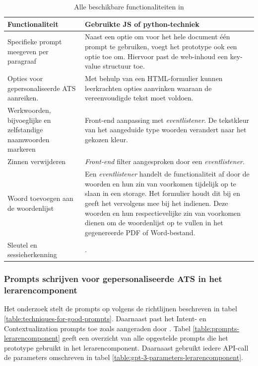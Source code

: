 \begin{center}
	\begin{table}[H]
		\begin{tabular}{ | m{7cm} | m{8cm} | } 
			\hline
			\textbf{Functionaliteit} & Gebruikte JS of python-techniek \\
			\hline
			Specifieke prompt meegeven per paragraaf & Naast een optie om voor het hele document één prompt te gebruiken, voegt het prototype ook een optie toe om. Hiervoor past de web-inhoud een key-value structuur toe. \\
			\hline
			Opties voor gepersonaliseerde ATS aanreiken. & Met behulp van een HTML-formulier kunnen leerkrachten opties aanvinken waaraan de vereenvoudigde tekst moet voldoen. \\
			\hline
			Werkwoorden, bijvoeglijke en zelfstandige naamwoorden markeren & Front-end aanpassing met \textit{eventlistener}. De tekstkleur van het aangeduide type woorden verandert naar het gekozen kleur. \\
			\hline
			Zinnen verwijderen & \textit{Front-end} filter aangesproken door een \textit{eventlistener}. \\
			\hline
			Woord toevoegen aan de woordenlijst & Een \textit{eventlistener} handelt de functionaliteit af door de woorden en hun zin van voorkomen tijdelijk op te slaan in een storage. Het formulier houdt dit bij en geeft het vervolgens mee bij het indienen. Deze woorden en hun respectievelijke zin van voorkomen dienen om de woordenlijst op te vullen in het gegenereerde PDF of Word-bestand. \\ 
			\hline
			Sleutel en sessieherkenning & . \\
			\hline 
		\end{tabular}
	\caption{Alle beschikbare functionaliteiten in }
	\label{table:functionaliteiten-leerkrachten}
	\end{table}
\end{center}

\subsubsection{Prompts schrijven voor gepersonaliseerde ATS in het lerarencomponent}

Het onderzoek stelt de prompts op volgens de richtlijnen beschreven in tabel \ref{table:techniques-for-good-prompts}. Daarnaast past het Intent- en Contextualization prompts toe zoals aangeraden door \textcite{White2023}. Tabel \ref{table:prompts-lerarencomponent} geeft een overzicht van alle opgestelde prompts die het prototype gebruikt in het lerarencomponent. Daarnaast gebruikt iedere API-call de parameters omschreven in tabel \ref{table:gpt-3-parameters-lerarencomponent}.

